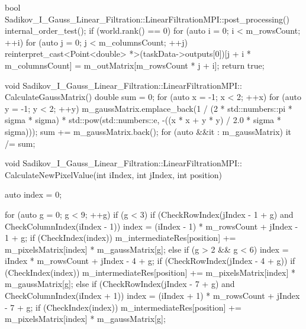 \documentclass[a4paper,14pt]{report}
\begin{document}
\begin{lstlistings}
bool Sadikov_I_Gauss_Linear_Filtration::LinearFiltrationMPI::post_processing() {
  internal_order_test();
  if (world.rank() == 0) {
    for (auto i = 0; i < m_rowsCount; ++i) {
      for (auto j = 0; j < m_columnsCount; ++j) {
        reinterpret_cast<Point<double> *>(taskData->outputs[0])[j + i * m_columnsCount] =
            m_outMatrix[m_rowsCount * j + i];
      }
    }
  }
  return true;
}

void Sadikov_I_Gauss_Linear_Filtration::LinearFiltrationMPI::
CalculateGaussMatrix() {
  double sum = 0;
  for (auto x = -1; x < 2; ++x) {
    for (auto y = -1; y < 2; ++y) {
      m_gaussMatrix.emplace_back(1 / (2 * std::numbers::pi * sigma * sigma) *
      std::pow(std::numbers::e, -((x * x + y * y) / 2.0 * sigma * sigma)));
      sum += m_gaussMatrix.back();
    }
  }
  for (auto &&it : m_gaussMatrix) {
    it /= sum;
  }
}

void Sadikov_I_Gauss_Linear_Filtration::LinearFiltrationMPI::
CalculateNewPixelValue(int iIndex, int jIndex, int position) {
  auto index = 0;

  for (auto g = 0; g < 9; ++g) {
    if (g < 3) {
      if (CheckRowIndex(jIndex - 1 + g) and CheckColumnIndex(iIndex - 1)) {
        index = (iIndex - 1) * m_rowsCount + jIndex - 1 + g;
        if (CheckIndex(index)) {
          m_intermediateRes[position] += m_pixelsMatrix[index] 
          * m_gaussMatrix[g];
        }
      }
    } else if (g > 2 && g < 6) {
      index = iIndex * m_rowsCount + jIndex - 4 + g;
      if (CheckRowIndex(jIndex - 4 + g)) {
        if (CheckIndex(index)) {
          m_intermediateRes[position] += m_pixelsMatrix[index] 
          * m_gaussMatrix[g];
        }
      }
    } else {
      if (CheckRowIndex(jIndex - 7 + g) and CheckColumnIndex(iIndex + 1)) {
        index = (iIndex + 1) * m_rowsCount + jIndex - 7 + g;
        if (CheckIndex(index)) {
          m_intermediateRes[position] += m_pixelsMatrix[index]
          * m_gaussMatrix[g];
        }
      }
    }
  }
}
\end{lstlistings}
\end{document}
